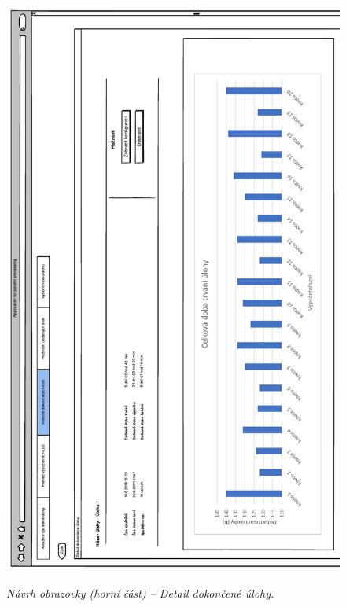 \begin{figure}[H]
\begin{center}
    \scalebox{1.0}
    {   
        \includegraphics{images/wireframe_finishedTaskDetail_1.pdf}
    }
    \caption{\label{obr:wireframe_finishedTaskDetail_1} {\it Návrh obrazovky (horní část) -- Detail dokončené úlohy.}}
\end{center}
\end{figure}

